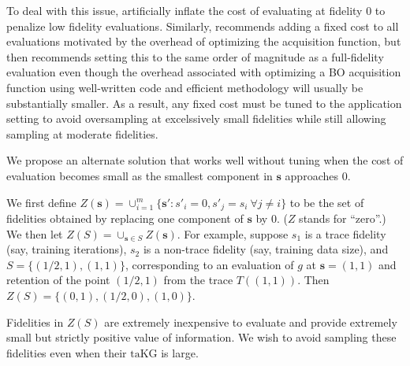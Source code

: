 \documentclass[letterpaper]{article}
\newcommand{\s}{\mathbf{s}}
\newcommand{\T}{T}
\newcommand{\Z}{Z}
\renewcommand{\S}{S}
\newcommand{\taKG}{\text{taKG}}
\numberwithin{equation}{section}
\begin{document}
To deal with this issue, \citet{klein2016fast,mcleod2017practical} artificially inflate the cost of evaluating at fidelity $0$ to penalize low fidelity evaluations.  Similarly, \citet{klein-bayesopt17} recommends adding a fixed cost to all evaluations motivated by the overhead of optimizing the acquisition function, but then recommends setting this to the same order of magnitude as a full-fidelity evaluation even though the overhead associated with optimizing a BO acquisition function using well-written code and efficient methodology will usually be substantially smaller. As a result, any fixed cost must be tuned to the application setting to avoid oversampling at excelssively small fidelities while still allowing sampling at moderate fidelities.

We propose an alternate solution that works well without tuning
when the cost of evaluation becomes small as the smallest component in $\s$ approaches 0.

We first define $\Z(\s) = \cup_{i=1}^m \{ \s' : s'_i = 0, s'_j = s_i\ \forall j\ne i \}$
to be the set of fidelities obtained by replacing one component of $\s$ by $0$. ($\Z$ stands for ``zero''.)
We then let $\Z(\S) = \cup_{\s \in \S} \Z(\s)$.
For example, suppose $s_1$ is a trace fidelity (say, training iterations), $s_2$ is a non-trace fidelity (say, training data size), and $\S = \{ (1/2, 1), (1,1) \}$, corresponding to an evaluation of $g$ at $\s=(1,1)$ and retention of the point $(1/2,1)$ from the trace $\T((1,1))$.
Then $\Z(\S) = \{ (0,1), (1/2, 0), (1,0) \}$.  %


Fidelities in $\Z(\S)$ are extremely inexpensive to evaluate and provide extremely small but strictly positive value of information.
We wish to avoid sampling these fidelities even when their $\taKG$ is large.
\end{document}
